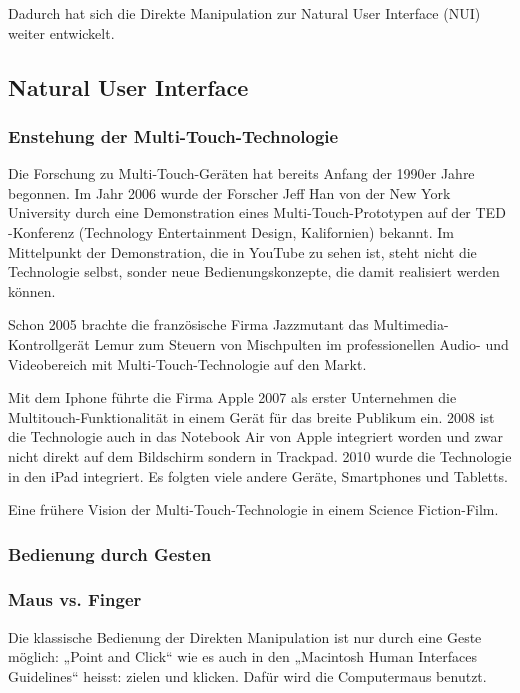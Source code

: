 Dadurch hat sich die Direkte Manipulation zur Natural User Interface (NUI) weiter entwickelt.
\subsection{Natural User Interface}
\subsubsection{Enstehung der Multi-Touch-Technologie}
Die Forschung zu Multi-Touch-Geräten hat bereits Anfang der 1990er Jahre begonnen.  Im Jahr 2006 wurde der Forscher Jeff Han von der New York University durch eine Demonstration eines Multi-Touch-Prototypen auf der TED -Konferenz (Technology Entertainment Design, Kalifornien) bekannt. Im Mittelpunkt der Demonstration, die in YouTube zu sehen ist, steht nicht die Technologie selbst, sonder neue Bedienungskonzepte, die damit realisiert werden können.
 
Schon 2005 brachte die französische Firma Jazzmutant das Multimedia-Kontrollgerät Lemur zum Steuern von Mischpulten im professionellen Audio- und Videobereich mit Multi-Touch-Technologie auf den Markt.
 
Mit dem Iphone führte die Firma Apple 2007 als erster Unternehmen die Multitouch-Funktionalität in einem Gerät für das breite Publikum ein. 2008 ist die Technologie auch in das Notebook Air von Apple integriert worden und zwar nicht direkt auf dem Bildschirm sondern in Trackpad. 2010 wurde die Technologie in den iPad integriert. Es folgten viele andere Geräte, Smartphones und Tabletts.

Eine frühere Vision der Multi-Touch-Technologie in einem Science Fiction-Film.
\subsubsection{Bedienung durch Gesten}
\subsubsection*{Maus vs. Finger}
Die klassische Bedienung der Direkten Manipulation ist nur durch eine Geste möglich: „Point and Click“ wie es auch in den „Macintosh Human Interfaces Guidelines“ heisst: zielen und klicken. Dafür wird die Computermaus benutzt. 
 
